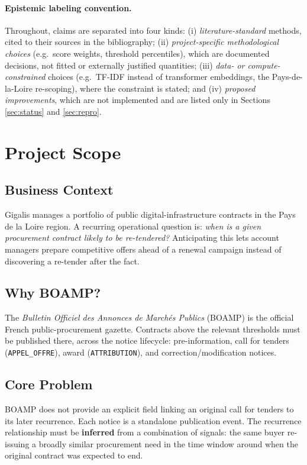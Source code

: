 \documentclass[11pt]{article}
\begin{document}
\paragraph{Epistemic labeling convention.} Throughout, claims are separated
into four kinds: (i) \emph{literature-standard} methods, cited to their
sources in the bibliography; (ii) \emph{project-specific methodological
choices} (e.g.\ score weights, threshold percentiles), which are documented
decisions, not fitted or externally justified quantities; (iii)
\emph{data- or compute-constrained} choices (e.g.\ TF-IDF instead of
transformer embeddings, the Pays-de-la-Loire re-scoping), where the
constraint is stated; and (iv) \emph{proposed improvements}, which are not
implemented and are listed only in Sections \ref{sec:status} and
\ref{sec:repro}.

\tableofcontents

\section{Project Scope}
\label{sec:scope}

\subsection{Business Context}
Gigalis manages a portfolio of public digital-infrastructure contracts in
the Pays de la Loire region. A recurring operational question is: \emph{when
is a given procurement contract likely to be re-tendered?} Anticipating this
lets account managers prepare competitive offers ahead of a renewal
campaign instead of discovering a re-tender after the fact.

\subsection{Why BOAMP?}
The \emph{Bulletin Officiel des Annonces de March\'es Publics} (BOAMP) is
the official French public-procurement gazette. Contracts above the
relevant thresholds must be published there, across the notice lifecycle:
pre-information, call for tenders (\texttt{APPEL\_OFFRE}), award
(\texttt{ATTRIBUTION}), and correction/modification notices.

\subsection{Core Problem}
BOAMP does not provide an explicit field linking an original call for
tenders to its later recurrence. Each notice is a standalone publication
event. The recurrence relationship must be \textbf{inferred} from a
combination of signals: the same buyer re-issuing a broadly similar
procurement need in the time window around when the original contract was
expected to end.
\end{document}
